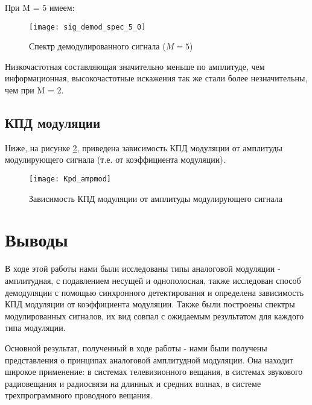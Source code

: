 При M = 5 имеем:
\begin{figure}[H]
	\begin{center}
		\texttt{[image: sig\_demod\_spec\_5\_0]}
		\caption{Спектр демодулированного сигнала ($M = 5$)} 
		\label{pic:sig_demod_spec_5_0} %
	\end{center}
\end{figure} 
Низкочастотная составляющая значительно меньше по амплитуде, чем информационная, высокочастотные искажения так же стали более незначительны, чем при M = 2.

\subsection{КПД модуляции}
Ниже, на рисунке \ref{pic:Kpd_ampmod}, приведена зависимость КПД модуляции от амплитуды модулирующего сигнала (т.е. от коэффициента модуляции).
\begin{figure}[H]
	\begin{center}
		\texttt{[image: Kpd\_ampmod]}
		\caption{Зависимость КПД модуляции от амплитуды модулирующего сигнала} 
		\label{pic:Kpd_ampmod} %
	\end{center}
\end{figure}

\section{Выводы}

В ходе этой работы нами были исследованы типы аналоговой модуляции - амплитудная, с подавлением несущей и однополосная, также исследован способ демодуляции с помощью синхронного детектирования и определена зависимость КПД модуляции от коэффициента модуляции. Также были построены спектры модулированных сигналов, их вид совпал с ожидаемым результатом для каждого типа модуляции.

Основной результат, полученный в ходе работы - нами были получены представления о принципах аналоговой амплитудной модуляции. Она находит широкое применение: в системах телевизионного вещания, в системах звукового радиовещания и радиосвязи на длинных и средних волнах, в системе трехпрограммного проводного вещания.


